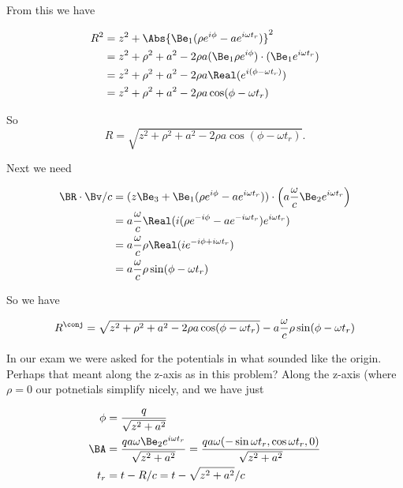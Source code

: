 From this we have

\begin{align*}
R^2 
&= z^2 + \Abs{\Be_1 (\rho e^{i \phi} - a e^{i \omega t_r} )}^2 \\
&= z^2 + \rho^2 + a^2 - 2 \rho a (\Be_1 \rho e^{i \phi}) \cdot (\Be_1 e^{i \omega t_r}) \\
&= z^2 + \rho^2 + a^2 - 2 \rho a \Real( e^{ i(\phi - \omega t_r) } ) \\
&= z^2 + \rho^2 + a^2 - 2 \rho a \cos(\phi - \omega t_r)
\end{align*}

So
\begin{equation}\label{eqn:relativisticElectrodynamicsExamReflection:n}
R = \sqrt{z^2 + \rho^2 + a^2 - 2 \rho a \cos( \phi - \omega t_r ) }.
\end{equation}

Next we need

\begin{align*}
\BR \cdot \Bv/c
&= 
(z \Be_3 + \Be_1 (\rho e^{i \phi} - a e^{i \omega t_r} )) \cdot  
\left(a \frac{\omega}{c} \Be_2 e^{i \omega t_r} \right) \\
&=
a \frac{\omega }{c}
\Real(
i (\rho e^{-i \phi} - a e^{-i \omega t_r} ) e^{i \omega t_r} ) \\
&=
a \frac{\omega }{c}
\rho \Real( i e^{-i \phi + i \omega t_r} ) \\
&=
a \frac{\omega }{c}
\rho \sin(\phi - \omega t_r)
\end{align*}

So we have

\begin{equation}\label{eqn:relativisticElectrodynamicsExamReflection:n}
R^\conj = \sqrt{z^2 + \rho^2 + a^2 - 2 \rho a \cos( \phi - \omega t_r ) }
-a \frac{\omega }{c} \rho \sin(\phi - \omega t_r)
\end{equation}

In our exam we were asked for the potentials in what sounded like the origin.  Perhaps that meant along the z-axis as in this problem?  Along the z-axis (where $\rho = 0$ our potnetials simplify nicely, and we have just

\begin{align}\label{eqn:relativisticElectrodynamicsExamReflection:n}
\phi &= \frac{q}{\sqrt{z^2 + a^2}} \\
\BA 
&= 
\frac{q a \omega \Be_2 e^{i \omega t_r} }{\sqrt{z^2 + a^2}} 
= 
\frac{q a \omega (-\sin \omega t_r, \cos\omega t_r, 0)}{\sqrt{z^2 + a^2}} \\
t_r &= t - R/c = t - \sqrt{z^2 + a^2}/c
\end{align}

